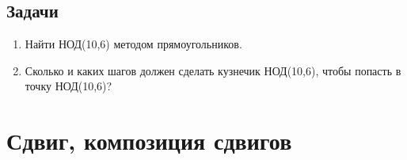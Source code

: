 \subsection{Задачи}
\begin{enumerate}
\item Найти НОД(10,6) методом прямоугольников.
\item Сколько и каких шагов должен сделать кузнечик НОД(10,6), чтобы попасть в точку НОД(10,6)?
\end{enumerate}




\section{Сдвиг, композиция сдвигов}

